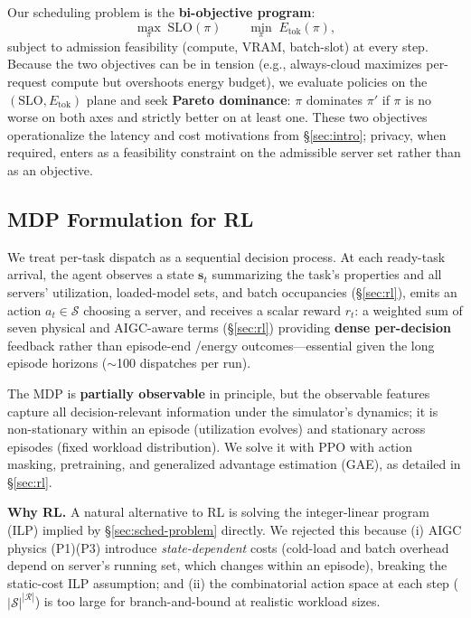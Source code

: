 Our scheduling problem is the \textbf{bi-objective program}:
\begin{equation}
  \max_\pi\; \text{SLO}(\pi)
  \qquad
  \min_\pi\; E_{\text{tok}}(\pi),
\end{equation}
subject to admission feasibility (compute, VRAM, batch-slot)
at every step. Because the two objectives can be in tension
(e.g., always-cloud maximizes per-request compute but
overshoots energy budget), we evaluate policies on the
$(\text{SLO}, E_{\text{tok}})$ plane and seek \textbf{Pareto
dominance}: $\pi$ dominates $\pi'$ if $\pi$ is no worse on both
axes and strictly better on at least one. These two objectives
operationalize the latency and cost motivations from
\S\ref{sec:intro}; privacy, when required, enters as a
feasibility constraint on the admissible server set rather
than as an objective.

\subsection{MDP Formulation for RL}
\label{sec:mdp}

We treat per-task dispatch as a sequential decision process.
At each ready-task arrival, the agent observes a state
$\mathbf{s}_t$ summarizing
the task's properties and all servers' utilization,
loaded-model sets, and batch occupancies (\S\ref{sec:rl}),
emits an action
$a_t \in \mathcal{S}$ choosing a server, and receives a scalar
reward $r_t$: a weighted sum of seven physical and AIGC-aware
terms (\S\ref{sec:rl}) providing
\textbf{dense per-decision} feedback rather than
episode-end \slo{}/energy outcomes---essential
given the long episode horizons ($\sim$100 dispatches per
run).

The MDP is \textbf{partially observable} in principle, but
the observable features capture all decision-relevant
information under the simulator's dynamics; it is
non-stationary within an episode (utilization
evolves) and stationary across
episodes (fixed workload distribution). We solve it with PPO
with action masking, pretraining, and generalized advantage
estimation (GAE), as detailed in
\S\ref{sec:rl}.

\textbf{Why RL.} A natural alternative to RL is solving the
integer-linear program (ILP) implied by \S\ref{sec:sched-problem}
directly. We rejected this because (i) AIGC physics (P1)(P3)
introduce \emph{state-dependent} costs (cold-load and batch
overhead depend on server's running set, which changes within
an episode), breaking the static-cost ILP assumption; and
(ii) the combinatorial action space at each step
($|\mathcal{S}|^{|\mathcal{R}|}$) is too large for
branch-and-bound at realistic workload sizes.
